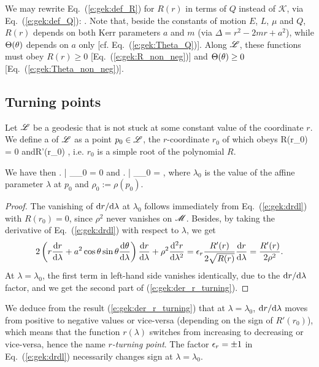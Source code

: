 We may rewrite Eq.~(\ref{e:gek:def_R}) for $R(r)$ in terms of $Q$
instead of $\mathscr{K}$, via Eq.~(\ref{e:gek:def_Q}):
\be \label{e:gek:def_R_Q}
   .
\ee
Note that, beside the constants of motion $E$, $L$, $\mu$ and $Q$, $R(r)$ depends on both Kerr parameters $a$ and $m$
(via $\Delta = r^2 - 2 m r + a^2$), while $\Theta(\theta)$
depends on $a$ only [cf. Eq.~(\ref{e:gek:Theta_Q})].
Along $\mathscr{L}$, these functions must obey
$R(r) \geq 0$ [Eq.~(\ref{e:gek:R_non_neg})] and $\Theta(\theta) \geq 0$
[Eq.~(\ref{e:gek:Theta_non_neg})].


\subsection{Turning points} \label{s:gek:turning_points}

Let $\mathscr{L}$ be a geodesic that is not stuck at some constant value of the
coordinate $r$.
We define a  of $\mathscr{L}$ as a point $p_0\in\mathscr{L}$, the $r$-coordinate $r_0$ of which obeys
\be \label{e:gek:def_r_turning}
    R(r_0) = 0 \quad\mbox{and}\quad R'(r_0)  ,
\ee
i.e. $r_0$ is a simple root of the polynomial $R$.

We have then
\be \label{e:gek:der_r_turning}
   \left.  \right| _{\lambda_0} = 0
   \quad\mbox{and}\quad
   \left.  \right| _{\lambda_0} =   ,
\ee
where $\lambda_0$ is the value of the affine parameter $\lambda$ at $p_0$
and $\rho_0 := \rho(p_0)$.
\begin{proof}
The vanishing of $\mathrm{d} r/\mathrm{d}\lambda$ at $\lambda_0$ follows immediately
from Eq.~(\ref{e:gek:drdl}) with $R(r_0)=0$, since $\rho^2$ never vanishes
on $\mathscr{M}$. Besides, by
taking the derivative of Eq.~(\ref{e:gek:drdl}) with respect to $\lambda$, we
get
\[
    2 \left(r \frac{\mathrm{d} r}{\mathrm{d} \lambda} + a^2 \cos\theta\sin\theta \frac{\mathrm{d} \theta}{\mathrm{d} \lambda} \right)
    \frac{\mathrm{d} r}{\mathrm{d} \lambda} + \rho^2 \frac{\mathrm{d}^2 r}{\mathrm{d}\lambda^2} =
    \epsilon_r \frac{R'(r)}{2\sqrt{R(r)}} \frac{\mathrm{d} r}{\mathrm{d} \lambda} = \frac{R'(r)}{2\rho^2} .
\]
At $\lambda=\lambda_0$, the first term in left-hand side vanishes identically,
due to the $\mathrm{d} r/\mathrm{d}\lambda$ factor,
and we get the second part of (\ref{e:gek:der_r_turning}).
\end{proof}

We deduce from the result (\ref{e:gek:der_r_turning}) that at $\lambda=\lambda_0$,
$\mathrm{d} r/\mathrm{d}\lambda$ moves from positive to negative values or vice-versa
(depending on the sign of $R'(r_0)$), which means that the function $r(\lambda)$
switches from increasing to decreasing or vice-versa, hence the name
\emph{$r$-turning point}. The factor $\epsilon_r=\pm 1$ in Eq.~(\ref{e:gek:drdl}) necessarily
changes sign at $\lambda=\lambda_0$.

